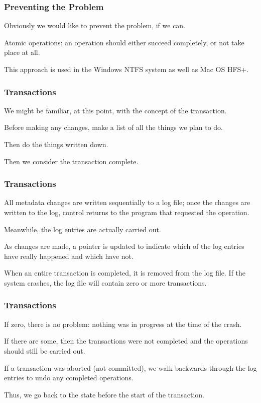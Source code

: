 \begin{frame}
\frametitle{Preventing the Problem}

Obviously we would like to prevent the problem, if we can. 

Atomic operations: an operation should either succeed completely, or not take place at all. 

This approach is used in the Windows NTFS system as well as Mac OS HFS+.


\end{frame}

\begin{frame}
\frametitle{Transactions}

We might be familiar, at this point, with the concept of the \alert{transaction}.

Before making any changes, make a list of all the things we plan to do. 

Then do the things written down. 

Then we consider the transaction complete.

\end{frame}

\begin{frame}
\frametitle{Transactions}

All metadata changes are written sequentially to a log file; once the changes are written to the log, control returns to the program that requested the operation. 

Meanwhile, the log entries are actually carried out. 

As changes are made, a pointer is updated to indicate which of the log entries have really happened and which have not.

When an entire transaction is completed, it is removed from the log file. If the system crashes, the log file will contain zero or more transactions.
\end{frame}

\begin{frame}
\frametitle{Transactions}

If zero, there is no problem: nothing was in progress at the time of the crash. 

If there are some, then the transactions were not completed and the operations should still be carried out. 

If a transaction was aborted (not committed), we walk backwards through the log entries to undo any completed operations.

Thus, we go back to the state before the start of the transaction.




\end{frame}

